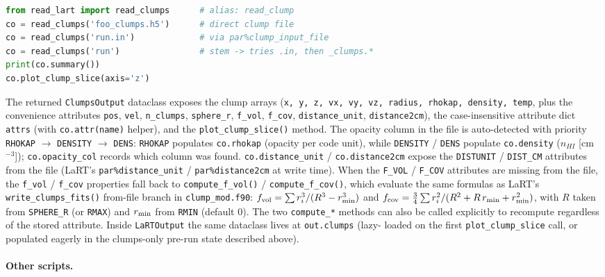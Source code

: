 \documentclass[english,a4paper]{my_memo}
\newcommand{\parm}[1]{\texttt{par\%#1}}
\begin{document}
\begin{lstlisting}[language=Python]
from read_lart import read_clumps      # alias: read_clump
co = read_clumps('foo_clumps.h5')      # direct clump file
co = read_clumps('run.in')             # via par%clump_input_file
co = read_clumps('run')                # stem -> tries .in, then _clumps.*
print(co.summary())
co.plot_clump_slice(axis='z')
\end{lstlisting}
The returned \texttt{ClumpsOutput} dataclass exposes the clump
arrays (\texttt{x, y, z, vx, vy, vz, radius, rhokap, density, temp},
plus the convenience attributes \texttt{pos}, \texttt{vel},
\texttt{n\_clumps}, \texttt{sphere\_r}, \texttt{f\_vol}, \texttt{f\_cov},
\texttt{distance\_unit}, \texttt{distance2cm}), the case-insensitive
attribute dict \texttt{attrs} (with \texttt{co.attr(name)} helper), and
the \texttt{plot\_clump\_slice()} method.  The opacity column in the
file is auto-detected with priority \texttt{RHOKAP} $\to$
\texttt{DENSITY} $\to$ \texttt{DENS}: \texttt{RHOKAP} populates
\texttt{co.rhokap} (opacity per code unit), while \texttt{DENSITY} /
\texttt{DENS} populate \texttt{co.density} ($n_{HI}$ [cm$^{-3}$]);
\texttt{co.opacity\_col} records which column was found.
\texttt{co.distance\_unit} / \texttt{co.distance2cm} expose the
\texttt{DISTUNIT} / \texttt{DIST\_CM} attributes from the file (LaRT's
\parm{distance\_unit} / \parm{distance2cm} at write time).  When the
\texttt{F\_VOL} / \texttt{F\_COV} attributes are missing from the file,
the \texttt{f\_vol} / \texttt{f\_cov} properties fall back to
\texttt{compute\_f\_vol()} / \texttt{compute\_f\_cov()}, which evaluate
the same formulas as LaRT's \texttt{write\_clumps\_fits()} from-file
branch in \texttt{clump\_mod.f90}:
\(f_{\rm vol} = \sum r_i^3 / (R^3 - r_{\rm min}^3)\) and
\(f_{\rm cov} = \tfrac{3}{4}\sum r_i^2 / (R^2 + R\,r_{\rm min} + r_{\rm min}^2)\),
with \(R\) taken from \texttt{SPHERE\_R} (or \texttt{RMAX}) and
\(r_{\rm min}\) from \texttt{RMIN} (default 0).  The two
\texttt{compute\_*} methods can also be called explicitly to recompute
regardless of the stored attribute.  Inside
\texttt{LaRTOutput} the same dataclass lives at \texttt{out.clumps} (lazy-
loaded on the first \texttt{plot\_clump\_slice} call, or populated
eagerly in the clumps-only pre-run state described above).

\paragraph{Other scripts.}
\end{document}
